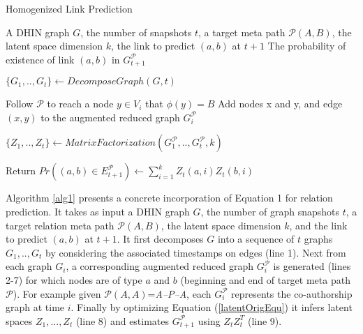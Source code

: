 \begin{algorithm}[t]
\caption{Homogenized Link Prediction}\label{alg1}
\begin{algorithmic}[1]\scriptsize
\REQUIRE A DHIN graph $G$, the number of snapshots $t$, a target meta path $\mathcal{P}(A,B)$, the latent space dimension $k$, the link to predict $(a,b)$ at $t+1$
\ENSURE The probability of existence of link $(a,b)$ in $G^\mathcal{P}_{t+1}$

\STATE $\{G_1, .., G_t\} \leftarrow DecomposeGraph(G, t)$

    
        \STATE Follow $\mathcal{P}$ to reach a node $y\in V_i$ that $\phi(y)=B$%
        \STATE Add nodes x and y, and edge $(x,y)$ to the augmented reduced graph $G_i^\mathcal{P}$ 
\ENDFOR

\ENDFOR

\STATE $\{Z_1, .., Z_t\} \leftarrow MatrixFactorization(G^\mathcal{P}_1, .., G^\mathcal{P}_t, k)$

\STATE Return $Pr((a,b)\in E^\mathcal{P}_{t+1}) \leftarrow \sum_{i=1}^{k} Z_t(a,i)Z_t(b,i)$


\end{algorithmic}
\end{algorithm}




Algorithm \ref{alg1}  presents a concrete incorporation of Equation 1 for relation prediction. It takes as input a DHIN graph $G$, the number of graph snapshots $t$, a target relation meta path $\mathcal{P}(A,B)$, the latent space dimension $k$, and the link to predict $(a,b)$ at $t+1$. It first decomposes $G$ into a sequence of $t$ graphs $G_1, .., G_t$ by considering the associated timestamps on edges (line 1). Next from each graph $G_i$, a corresponding augmented reduced graph $G^\mathcal{P}_i$ is generated (lines 2-7) for which nodes are of type $a$ and $b$ (beginning and end of target  meta path $\mathcal{P}$). For example given $\mathcal{P}(A,A)$=\textit{A--P--A}, each $G^\mathcal{P}_i$ represents the co-authorship graph at time $i$. Finally by optimizing Equation (\ref{latentOrigEqu}) it infers latent spaces $Z_1, ...,Z_t$ (line 8) and estimates $G^\mathcal{P}_{t+1}$ using $Z_tZ_t^T$ (line 9). 




